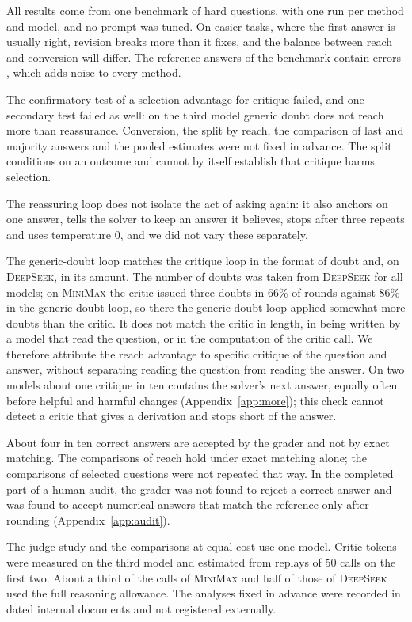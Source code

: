 \documentclass[11pt]{article}
\newcommand{\ds}{\textsc{DeepSeek}}
\newcommand{\mm}{\textsc{MiniMax}}
\begin{document}
All results come from one benchmark of hard questions, with one run per method and model, and no prompt was tuned.
On easier tasks, where the first answer is usually right, revision breaks more than it fixes, and the balance between reach and conversion will differ.
The reference answers of the benchmark contain errors \citep{zhai2026hleverified}, which adds noise to every method.

The confirmatory test of a selection advantage for critique failed, and one secondary test failed as well: on the third model generic doubt does not reach more than reassurance.
Conversion, the split by reach, the comparison of last and majority answers and the pooled estimates were not fixed in advance.
The split conditions on an outcome and cannot by itself establish that critique harms selection.

The reassuring loop does not isolate the act of asking again: it also anchors on one answer, tells the solver to keep an answer it believes, stops after three repeats and uses temperature 0, and we did not vary these separately.

The generic-doubt loop matches the critique loop in the format of doubt and, on \ds, in its amount.
The number of doubts was taken from \ds{} for all models; on \mm{} the critic issued three doubts in 66\% of rounds against 86\% in the generic-doubt loop, so there the generic-doubt loop applied somewhat more doubts than the critic.
It does not match the critic in length, in being written by a model that read the question, or in the computation of the critic call.
We therefore attribute the reach advantage to specific critique of the question and answer, without separating reading the question from reading the answer.
On two models about one critique in ten contains the solver's next answer, equally often before helpful and harmful changes (Appendix~\ref{app:more}); this check cannot detect a critic that gives a derivation and stops short of the answer.

About four in ten correct answers are accepted by the grader and not by exact matching.
The comparisons of reach hold under exact matching alone; the comparisons of selected questions were not repeated that way.
In the completed part of a human audit, the grader was not found to reject a correct answer and was found to accept numerical answers that match the reference only after rounding (Appendix~\ref{app:audit}).

The judge study and the comparisons at equal cost use one model.
Critic tokens were measured on the third model and estimated from replays of 50 calls on the first two.
About a third of the calls of \mm{} and half of those of \ds{} used the full reasoning allowance.
The analyses fixed in advance were recorded in dated internal documents and not registered externally.
\end{document}
